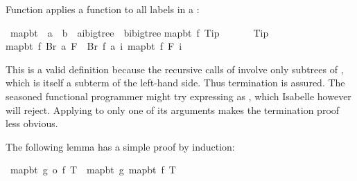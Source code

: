 \begin{isabellebody}
\begin{isamarkuptext}
Function  applies a function to all labels in a :%
\end{isamarkuptext}%
\isamarkuptrue%
\ map{\isacharunderscore}bt\ {\isacharcolon}{\isacharcolon}\ {\isachardoublequote}{\isacharparenleft}{\isacharprime}a\ {\isasymRightarrow}\ {\isacharprime}b{\isacharparenright}\ {\isasymRightarrow}\ {\isacharparenleft}{\isacharprime}a{\isacharcomma}{\isacharprime}i{\isacharparenright}bigtree\ {\isasymRightarrow}\ {\isacharparenleft}{\isacharprime}b{\isacharcomma}{\isacharprime}i{\isacharparenright}bigtree{\isachardoublequote}\isanewline
\isamarkupfalse%
\isanewline
{\isachardoublequote}map{\isacharunderscore}bt\ f\ Tip\ \ \ \ \ \ {\isacharequal}\ Tip{\isachardoublequote}\isanewline
{\isachardoublequote}map{\isacharunderscore}bt\ f\ {\isacharparenleft}Br\ a\ F{\isacharparenright}\ {\isacharequal}\ Br\ {\isacharparenleft}f\ a{\isacharparenright}\ {\isacharparenleft}{\isasymlambda}i{\isachardot}\ map{\isacharunderscore}bt\ f\ {\isacharparenleft}F\ i{\isacharparenright}{\isacharparenright}{\isachardoublequote}\isamarkupfalse%
%
\begin{isamarkuptext}%
\noindent This is a valid  definition because the
recursive calls of  involve only subtrees of
, which is itself a subterm of the left-hand side. Thus termination
is assured.  The seasoned functional programmer might try expressing
 as , which Isabelle 
however will reject.  Applying  to only one of its arguments
makes the termination proof less obvious.

The following lemma has a simple proof by induction:%
\end{isamarkuptext}%
\isamarkuptrue%
\ {\isachardoublequote}map{\isacharunderscore}bt\ {\isacharparenleft}g\ o\ f{\isacharparenright}\ T\ {\isacharequal}\ map{\isacharunderscore}bt\ g\ {\isacharparenleft}map{\isacharunderscore}bt\ f\ T{\isacharparenright}{\isachardoublequote}\isanewline
\isamarkupfalse%
\isamarkupfalse%
\isamarkupfalse%
\isamarkupfalse%
\isamarkupfalse%
\isamarkuptrue%
\isamarkupfalse%
\isamarkupfalse%
\end{isabellebody}%
